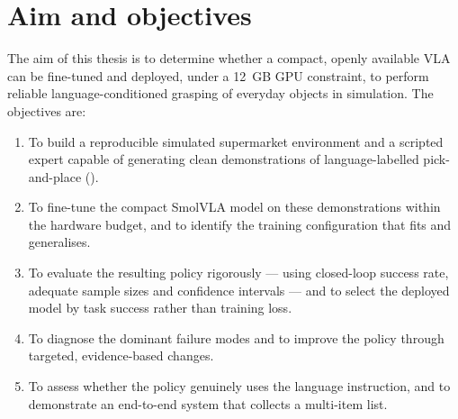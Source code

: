 \section{Aim and objectives}
\label{sec:aims}
The aim of this thesis is to determine whether a compact, openly available VLA can
be fine-tuned and deployed, under a 12~GB GPU constraint, to perform reliable
language-conditioned grasping of everyday objects in simulation. The objectives
are:
\begin{enumerate}
    \item To build a reproducible simulated supermarket environment and a scripted
    expert capable of generating clean demonstrations of language-labelled
    pick-and-place ().
    \item To fine-tune the compact SmolVLA model on these demonstrations within the
    hardware budget, and to identify the training configuration that fits and
    generalises.
    \item To evaluate the resulting policy rigorously --- using closed-loop success
    rate, adequate sample sizes and confidence intervals --- and to select the
    deployed model by task success rather than training loss.
    \item To diagnose the dominant failure modes and to improve the policy through
    targeted, evidence-based changes.
    \item To assess whether the policy genuinely uses the language instruction, and
    to demonstrate an end-to-end system that collects a multi-item list.
\end{enumerate}


